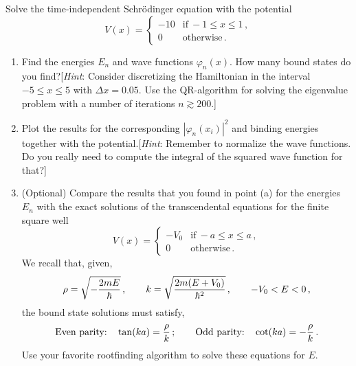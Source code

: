 \begin{exercise}
	Solve the time-independent Schr\"odinger equation with the potential
	\[
		V(x)=
		\begin{cases}
			-10 & \text{if}\  -1 \leq x \leq 1\,, \\[2ex]
			0   & \text{otherwise}\,.
		\end{cases}
	\]
	\begin{enumerate}
		\item Find the energies $E_n$ and wave functions $\varphi_n(x)$. How
		      many bound states do you find?[\emph{Hint}: Consider discretizing the
			      Hamiltonian in the interval $-5\leq x\leq 5$ with $\Delta x=0.05$. Use the
			      QR-algorithm for solving the eigenvalue problem with a number of iterations
			      $n\gtrsim 200$.]
		\item Plot the results for the corresponding $|\varphi_n(x_i)|^2$ and
		      binding energies together with the potential.[\emph{Hint}: Remember to normalize
					the wave functions. Do you really need to compute the integral of the squared
					wave function for that?]
		\item (Optional) Compare the results that you found in point
		      (a) for the energies $E_n$ with the exact solutions of the transcendental
		      equations for the finite square well
		      \[
			      V(x)=
			      \begin{cases}
				      -V_0 & \text{if}\  -a \leq x \leq a\,, \\[2ex]
				      0    & \text{otherwise}\,.
			      \end{cases}
		      \]
		      We recall that, given,
		      \[
			      \rho=\sqrt{-{2mE\over \hbar}}\,,
			      \qquad
			      k = \sqrt{2m(E+V_0)\over \hbar^2}\,,
			      \qquad
			      -V_0<E<0\,,
		      \]
		      the bound state solutions must satisfy,
		      \[
			      \text{Even parity:} \quad  \tan (ka) = {\rho\over k}\,;
			      \qquad
			      \text{Odd parity:} \quad \cot (ka) = -{\rho\over k}\,.
		      \]
		      Use your favorite rootfinding algorithm to solve these equations for $E$.
	\end{enumerate}
\end{exercise}

